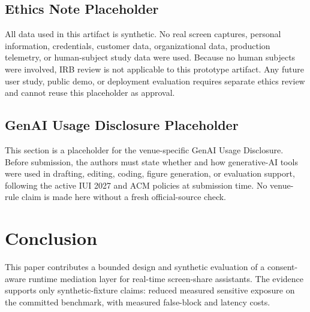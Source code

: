 \documentclass[manuscript,review,anonymous]{acmart}
\begin{document}
\subsection{Ethics Note Placeholder}
All data used in this artifact is synthetic.
No real screen captures, personal information, credentials, customer data, organizational data, production telemetry, or human-subject study data were used.
Because no human subjects were involved, IRB review is not applicable to this prototype artifact.
Any future user study, public demo, or deployment evaluation requires separate ethics review and cannot reuse this placeholder as approval.

\subsection{GenAI Usage Disclosure Placeholder}
This section is a placeholder for the venue-specific GenAI Usage Disclosure.
Before submission, the authors must state whether and how generative-AI tools were used in drafting, editing, coding, figure generation, or evaluation support, following the active IUI 2027 and ACM policies at submission time.
No venue-rule claim is made here without a fresh official-source check.

\section{Conclusion}
This paper contributes a bounded design and synthetic evaluation of a consent-aware runtime mediation layer for real-time screen-share assistants.
The evidence supports only synthetic-fixture claims: reduced measured sensitive exposure on the committed benchmark, with measured false-block and latency costs.



\end{document}

